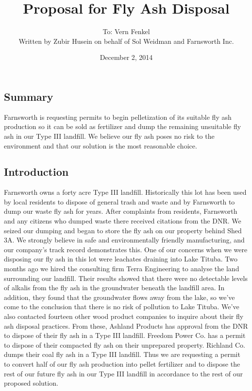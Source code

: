\documentclass[a4paper,10pt]{article}
\begin{document}
\title{Proposal for Fly Ash Disposal}
\date{December 2, 2014}
\author{To: Vern Fenkel\\Written by Zubir Husein on behalf of Sol Weidman and Farnsworth Inc.}
\maketitle

\small

\begin{multicols*}{2}

\subsection*{Summary}

Farnsworth is requesting permits to begin pelletization of its suitable fly ash production so it can be sold as
fertilizer and dump the remaining unsuitable fly ash in our Type III landfill. We believe our fly ash poses no risk to
the environment and that our solution is the most reasonable choice.

\subsection*{Introduction}
Farnsworth owns a forty acre Type III landfill. Historically this lot has been used by local residents to dispose of
general trash and waste and by Farnsworth to dump our waste fly ash for years. After complaints from residents,
Farnsworth and any citizens who dumped waste there received citations from the DNR. We seized our dumping and began to
store the fly ash on our property behind Shed 3A.
We strongly believe in safe and environmentally friendly manufacturing, and our company’s track record demonstrates
this. One of our concerns when we were disposing our fly ash in this lot were leachates draining into Lake Tituba.
Two months ago we hired the consulting firm Terra Engineering to analyse the land surrounding our landfill. Their
results showed that there were no detectable levels of alkalis from the fly ash in the groundwater beneath the landfill
area. In addition, they found that the groundwater flows away from the lake, so we've come to the conclusion that there
is no risk of pollution to Lake Tituba. We've also contacted fourteen other wood product companies to inquire about
their fly ash disposal practices. From these, Ashland Products has approval from the DNR to dispose of their fly ash in
a Type III landfill. Freedom Power Co. has a permit to dispose of their compacted fly ash on their unprepared property.
Richland Co. dumps their coal fly ash in a Type III landfill.
Thus we are requesting a permit to convert half of our fly ash production into pellet fertilizer and to dispose the rest
of our future fly ash in our Type III landfill in accordance to the rest of our proposed solution.


\end{multicols*}
\end{document}

